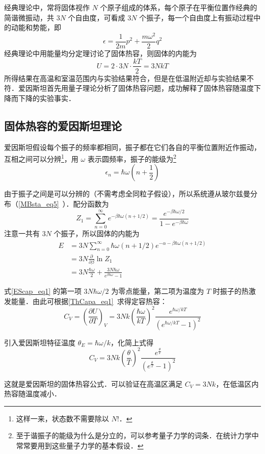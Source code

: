 

经典理论中，常将固体视作 $N$ 个原子组成的体系，每个原子在平衡位置作经典的简谐微振动，共 $3N$ 个自由度，可看成 $3N$ 个振子，每一个自由度上有振动过程中的动能和势能，即
\begin{equation}
\epsilon=\frac{1}{2m}p^2+\frac{m\omega^2}{2}q^2
\end{equation}
经典理论中用能量均分定理讨论了固体热容，则固体的内能为
\begin{equation}
U=2\cdot 3N\cdot \frac{kT}{2}=3NkT
\end{equation}
所得结果在高温和室温范围内与实验结果符合，但是在低温附近却与实验结果不符．爱因斯坦首先用量子理论分析了固体热容问题，成功解释了固体热容随温度下降而下降的实验事实．

\subsection{固体热容的爱因斯坦理论}
爱因斯坦假设每个振子的频率都相同，振子都在它们各自的平衡位置附近作振动，互相之间可以分辨\footnote{这样一来，状态数不需要除以 $N!$．}，用 $\omega$ 表示圆频率，振子的能级为\footnote{至于谐振子的能级为什么是分立的，可以参考量子力学的词条．在统计力学中常常要用到这些量子力学的基本假设．}
\begin{equation}
\epsilon_n=\hbar \omega\left(n+\frac{1}{2}\right)
\end{equation}

由于振子之间是可以分辨的（不需考虑全同粒子假设），所以系统遵从玻尔兹曼分布（\autoref{MBsta_eq5}~）．配分函数为
\begin{equation}
Z_1=\sum_{n=0}^\infty e^{-\beta \hbar \omega(n+1/2)}=\frac{e^{-\beta\hbar \omega/2}}{1-e^{-\beta\hbar\omega}}
\end{equation}
注意一共有 $3N$ 个振子，所以固体的内能为
\begin{equation}\label{EScap_eq1}
\begin{aligned}
E&=3N\sum_{n=0}^\infty \hbar\omega(n+1/2)e^{-\alpha-\beta\hbar\omega(n+1/2)}\\
&=3N\frac{\partial }{\partial \beta}\ln Z_1\\
&=3N\frac{\hbar \omega}{2}+\frac{3N\hbar \omega}{e^{\beta\hbar\omega}-1}
\end{aligned}
\end{equation}

式\autoref{EScap_eq1} 的第一项 $3N \hbar\omega/2$ 为零点能量，第二项为温度为 $T$ 时振子的热激发能量．由此可根据\autoref{ThCapa_eq1}~求得定容热容：
\begin{equation}
C_V=\left(\frac{\partial U}{\partial T}\right)_V=3Nk\left(\frac{\hbar \omega}{kT}\right)^2\frac{e^{\hbar \omega/kT}}{(e^{\hbar \omega/kT}-1)^2}
\end{equation}

引入爱因斯坦特征温度 $\theta_E=\hbar\omega/k$，化简上式得
\begin{equation}
C_V=3Nk\left(\frac{\theta}{T}\right)^2\frac{e^{\frac{\theta}{T}}}{(e^{\frac{\theta}{T}}-1)^2}
\end{equation}

这就是爱因斯坦的固体热容公式．可以验证在高温区满足 $C_V=3Nk$，在低温区内热容随温度减小．

